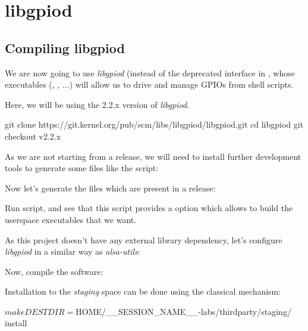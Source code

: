 \section{libgpiod}

\subsection{Compiling libgpiod}

We are now going to use {\em libgpiod} (instead of the
deprecated interface in , whose executables
(, , ...) will
allow us to drive and manage GPIOs from shell scripts.

Here, we will be using the 2.2.x version of {\em libgpiod}.

\begin{bashinput}
git clone https://git.kernel.org/pub/scm/libs/libgpiod/libgpiod.git
cd libgpiod
git checkout v2.2.x
\end{bashinput}

As we are not starting from a release, we will need to install
further development tools to generate some files like the
 script:


Now let's generate the files which are present in a release:


Run  script, and see that this script provides
a  option which allows to build the userspace
executables that we want.

As this project doesn't have any external library dependency, let's
configure {\em libgpiod} in a similar way as {\em alsa-utils}:


Now, compile the software:


Installation to the {\em staging} space can be done using the
classical  mechanism:

\begin{bashinput}
$ make DESTDIR=$HOME/__SESSION_NAME__-labs/thirdparty/staging/ install
\end{bashinput}

